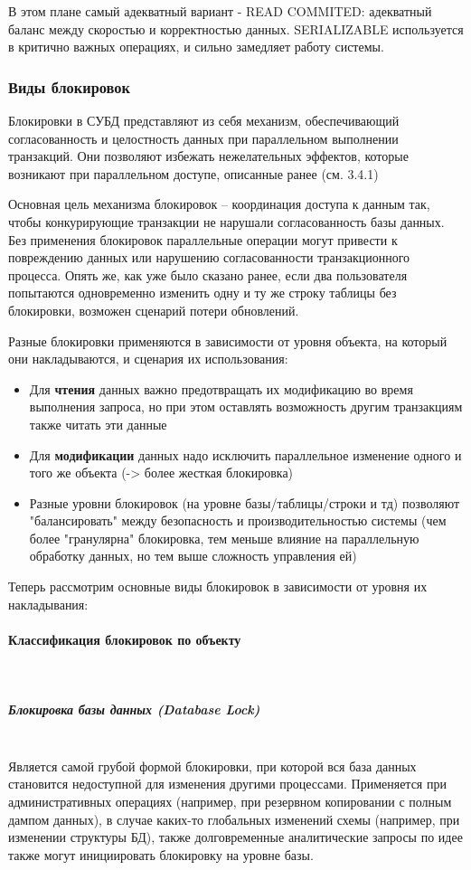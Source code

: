  В этом плане самый адекватный вариант - READ COMMITED: адекватный баланс между скоростью и корректностью данных. SERIALIZABLE используется в критично важных операциях, и сильно замедляет работу системы.
 
 \subsubsection{Виды блокировок}
 
 Блокировки в СУБД представляют из себя механизм, обеспечивающий согласованность и целостность данных при параллельном выполнении транзакций. Они позволяют избежать нежелательных эффектов, которые возникают при параллельном доступе, описанные ранее (см. 3.4.1)
 
 Основная цель механизма блокировок – координация доступа к данным так, чтобы конкурирующие транзакции не нарушали согласованность базы данных. Без применения блокировок параллельные операции могут привести к повреждению данных или нарушению согласованности транзакционного процесса. Опять же, как уже было сказано ранее, если два пользователя попытаются одновременно изменить одну и ту же строку таблицы без блокировки, возможен сценарий потери обновлений.
 
 Разные блокировки применяются в зависимости от уровня объекта, на который они накладываются, и сценария их использования:
 
 \begin{itemize}
     \item Для \textbf{чтения} данных важно предотвращать их модификацию во время выполнения запроса, но при этом оставлять возможность другим транзакциям также читать эти данные
     \item Для \textbf{модификации} данных надо исключить параллельное изменение одного и того же объекта (-> более жесткая блокировка)
     \item Разные уровни блокировок (на уровне базы/таблицы/строки и тд) позволяют "балансировать" между безопасность и производительностью системы (чем более "гранулярна" блокировка, тем меньше влияние на параллельную обработку данных, но тем выше сложность управления ей) \autocite[ch.22]{ElmasriNavathe}
 \end{itemize}
 
 Теперь рассмотрим основные виды блокировок в зависимости от уровня их накладывания:
 
 \paragraph{Классификация блокировок по объекту} ~\\
 \subparagraph{Блокировка базы данных (Database Lock)} ~\\
 Является самой грубой формой блокировки, при которой вся база данных становится недоступной для изменения другими процессами. Применяется при административных операциях (например, при резервном копировании с полным дампом данных), в случае каких-то глобальных изменений схемы (например, при изменении структуры БД), также долговременные аналитические запросы по идее также могут инициировать блокировку на уровне базы.
 

